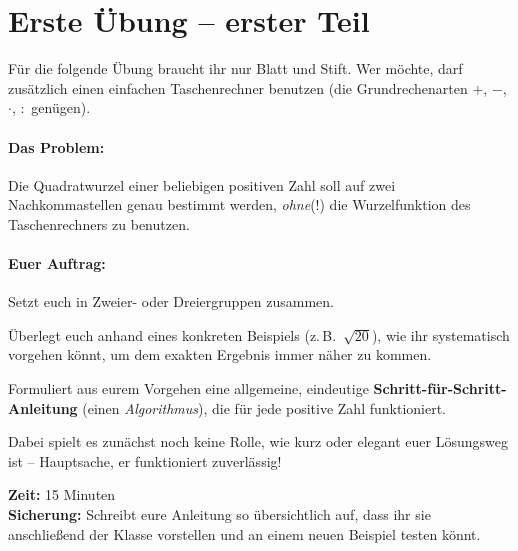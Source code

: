 \clearpage

\rehead[]{\textcolor{lightblue}{AvHG, Inf, My}}
\lohead[]{\textcolor{lightblue}{AvHG, Inf, My}}

\section{Erste Übung -- erster Teil}

Für die folgende Übung braucht ihr nur Blatt und Stift. Wer möchte, darf
zusätzlich einen einfachen Taschenrechner benutzen (die Grundrechenarten
$+$, $-$, $\cdot$, $:$ genügen).

\paragraph{Das Problem:}
Die Quadratwurzel einer beliebigen positiven Zahl soll auf zwei Nachkommastellen
genau bestimmt werden, \emph{ohne}(!) die Wurzelfunktion des Taschenrechners zu
benutzen.

\paragraph{Euer Auftrag:}
\begin{compactenum}[1.]
\item Setzt euch in Zweier- oder Dreiergruppen zusammen.
\item Überlegt euch anhand eines konkreten Beispiels (z.\,B.\ $\sqrt{20}$), wie
ihr systematisch vorgehen könnt, um dem exakten Ergebnis immer näher zu kommen.
\item Formuliert aus eurem Vorgehen eine allgemeine, eindeutige
\textbf{Schritt-für-Schritt-Anleitung} (einen \emph{Algorithmus}), die für
jede positive Zahl funktioniert.
\end{compactenum}

\medskip
\noindent Dabei spielt es zunächst noch keine Rolle, wie kurz oder elegant euer
Lösungsweg ist -- Hauptsache, er funktioniert zuverlässig!

\medskip
\noindent \textbf{Zeit:} 15 Minuten \\
\textbf{Sicherung:} Schreibt eure Anleitung so übersichtlich auf, dass ihr sie
anschließend der Klasse vorstellen und an einem neuen Beispiel testen könnt.
